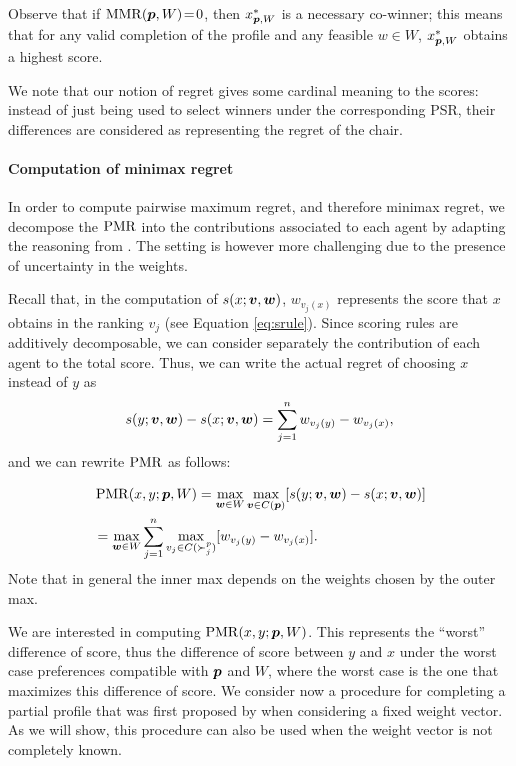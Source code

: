 \documentclass[sigconf, anonymous]{aamas}
\begin{document}
Observe that if $\operatorname{MMR}({\bm{p}}, W)\!=\!0$, then $x^{*}_{{\bm{p}},W}$ is a necessary co-winner; this means that for any valid completion of the profile and any feasible $w \!\in\! W$, $x^{*}_{{\bm{p}},W}$ obtains a highest score.

We note that our notion of regret gives some cardinal meaning to the scores: instead of just being used to select winners under the corresponding PSR, their differences are considered as representing the regret of the chair.


\paragraph{Computation of minimax regret}
In order to compute pairwise maximum regret, and therefore minimax regret, we decompose the $\operatorname{PMR}$ into the contributions associated to each agent by adapting the reasoning from \citet{Lu2011}.
The setting is however more challenging due to the presence of uncertainty in the weights.

Recall that, in the computation of $s(x; \bm{v}, \bm{w})$, $w_{v_j(x)}$ represents the score that $x$ obtains in the ranking $v_j$ (see Equation \ref{eq:srule}).
Since scoring rules are additively decomposable, we can consider separately the contribution of each agent to the total score. Thus, we can write the actual regret of choosing $x$ instead of $y$ as
\[
s(y; \bm{v},\bm{w}) - s(x; \bm{v}, \bm{w}) = \sum_{j=1}^n w_{v_j(y)} - w_{v_j(x)},
\]
and we can rewrite $\operatorname{PMR}$ as follows:

\begin{align}
	& \operatorname{PMR}(x,y; {\bm{p}}, W) = \max_{\bm{w} \in W} \max_{\bm{v} \in C({\bm{p}})} [ s(y; \bm{v},\bm{w}) - s(x; \bm{v},\bm{w}) ] \\
	& =  \max_{\bm{w} \in W} \sum_{j=1}^{n} \max_{v_j \in C(\succ_j^p)} [w_{v_j(y)} - w_{v_j(x)}]. \\
\end{align}
Note that in general the inner max depends on the weights chosen by the outer max.

We are interested in computing $\operatorname{PMR}(x, y; {\bm{p}}, W)$. This represents the “worst” difference of score, thus the difference of score between $y$ and $x$ under the worst case preferences compatible with ${\bm{p}}$ and $W$, where the worst case is the one that maximizes this difference of score.
We consider now a procedure for completing a partial profile that was first proposed by \citet{Lu2011} when considering %
a fixed weight vector.
As we will show, this procedure can also be used when the weight vector is not completely known.
\end{document}
